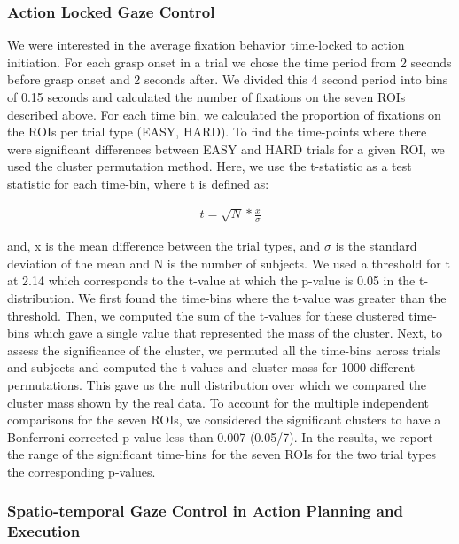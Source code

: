 \subsubsection{Action Locked Gaze Control}\label{sec:avg_fixations}

We were interested in the average fixation behavior time-locked to action initiation. For each grasp onset in a trial we chose the time period from 2 seconds before grasp onset and 2 seconds after. We divided this 4 second period into bins of 0.15 seconds and calculated the number of fixations on the seven ROIs described above. For each time bin, we calculated the proportion of fixations on the ROIs per trial type (EASY, HARD). To find the time-points where there were significant differences between EASY and HARD trials for a given ROI, we used the cluster permutation method. Here, we use the t-statistic as a test statistic for each time-bin, where t is defined as:

\begin{gather*}\label{eq:cluster_permutation}
 t = \sqrt{N} * \frac{x}{\sigma}
 \end{gather*}

and, x is the mean difference between the trial types, and $\sigma$ is the standard deviation of the mean and N is the number of subjects. We used a threshold for t at 2.14 which corresponds to the t-value at which the p-value is 0.05 in the t-distribution. We first found the time-bins where the t-value was greater than the threshold. Then, we computed the sum of the t-values for these clustered time-bins which gave a single value that represented the mass of the cluster. Next, to assess the significance of the cluster, we permuted all the time-bins across trials and subjects and computed the t-values and cluster mass for 1000 different permutations. This gave us the null distribution over which we compared the cluster mass shown by the real data. To account for the multiple independent comparisons for the seven ROIs, we considered the significant clusters to have a Bonferroni corrected p-value less than 0.007 (0.05/7). In the results, we report the range of the significant time-bins for the seven ROIs for the two trial types the corresponding p-values. 

\subsubsection{Spatio-temporal Gaze Control in Action Planning and Execution}\label{sec:transitions}

